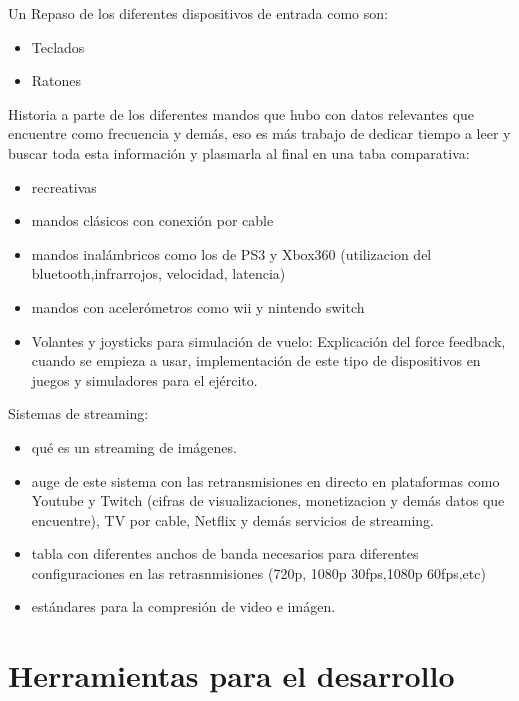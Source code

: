 Un 
Repaso de los diferentes dispositivos de entrada como son:
\begin {itemize}

\item Teclados
\item Ratones

\end {itemize}


Historia a parte de los diferentes mandos que hubo con datos relevantes que encuentre como frecuencia y dem\'as, eso es m\'as trabajo de dedicar tiempo a leer y buscar toda esta informaci\'on y plasmarla al final en una taba comparativa:
\begin {itemize}
\item recreativas
\item mandos cl\'asicos con conexi\'on por cable
\item mandos inal\'ambricos como los de PS3 y Xbox360 (utilizacion del bluetooth,infrarrojos, velocidad, latencia)
\item mandos con aceler\'ometros como wii y nintendo switch
\item Volantes y joysticks para simulaci\'on de vuelo: Explicaci\'on del force feedback, cuando se empieza a usar, implementaci\'on de este tipo de dispositivos en juegos y simuladores para el ej\'ercito.
\end {itemize}

Sistemas de streaming:
\begin {itemize}
\item qu\'e es un streaming de im\'agenes.
\item auge de este sistema con las retransmisiones en directo en plataformas como Youtube y Twitch (cifras de visualizaciones, monetizacion y dem\'as datos  que encuentre), TV por cable, Netflix y dem\'as servicios de streaming.
\item tabla con diferentes anchos de banda necesarios para diferentes configuraciones en las retrasnmisiones (720p, 1080p 30fps,1080p 60fps,etc)
\item est\'andares para la compresi\'on de video e im\'agen. 
\end {itemize}


\section{Herramientas para el desarrollo}
\label{cap2:sec:herramientas}

